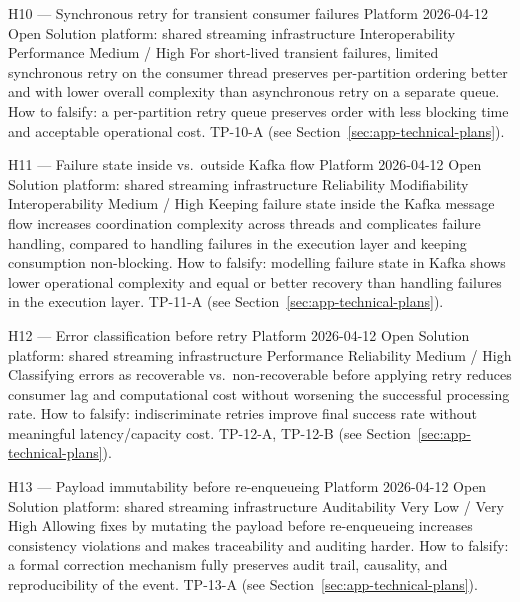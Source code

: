 \hypoboxnine%
  {H10 --- Synchronous retry for transient consumer failures}%
  {Platform}%
  {2026-04-12}%
  {Open}%
  {Solution}%
  {platform: shared streaming infrastructure}%
  {Interoperability \textbar{} Performance}%
  {Medium / High}%
  {For short-lived transient failures, limited synchronous retry on the consumer
   thread preserves per-partition ordering better and with lower overall complexity
   than asynchronous retry on a separate queue.}%
\hypoboxtail%
  {How to falsify: a per-partition retry queue preserves order with less blocking
   time and acceptable operational cost.}%
  {TP-10-A (see Section~\ref{sec:app-technical-plans}).}

\hypoboxnine%
  {H11 --- Failure state inside vs.\ outside Kafka flow}%
  {Platform}%
  {2026-04-12}%
  {Open}%
  {Solution}%
  {platform: shared streaming infrastructure}%
  {Reliability \textbar{} Modifiability \textbar{} Interoperability}%
  {Medium / High}%
  {Keeping failure state inside the Kafka message flow increases coordination
   complexity across threads and complicates failure handling, compared to
   handling failures in the execution layer and keeping consumption non-blocking.}%
\hypoboxtail%
  {How to falsify: modelling failure state in Kafka shows lower operational
   complexity and equal or better recovery than handling failures in the execution
   layer.}%
  {TP-11-A (see Section~\ref{sec:app-technical-plans}).}

\hypoboxnine%
  {H12 --- Error classification before retry}%
  {Platform}%
  {2026-04-12}%
  {Open}%
  {Solution}%
  {platform: shared streaming infrastructure}%
  {Performance \textbar{} Reliability}%
  {Medium / High}%
  {Classifying errors as recoverable vs.\ non-recoverable before applying retry
   reduces consumer lag and computational cost without worsening the successful
   processing rate.}%
\hypoboxtail%
  {How to falsify: indiscriminate retries improve final success rate without
   meaningful latency/capacity cost.}%
  {TP-12-A, TP-12-B (see Section~\ref{sec:app-technical-plans}).}

\hypoboxnine%
  {H13 --- Payload immutability before re-enqueueing}%
  {Platform}%
  {2026-04-12}%
  {Open}%
  {Solution}%
  {platform: shared streaming infrastructure}%
  {Auditability}%
  {Very Low / Very High}%
  {Allowing fixes by mutating the payload before re-enqueueing increases
   consistency violations and makes traceability and auditing harder.}%
\hypoboxtail%
  {How to falsify: a formal correction mechanism fully preserves audit trail,
   causality, and reproducibility of the event.}%
  {TP-13-A (see Section~\ref{sec:app-technical-plans}).}

